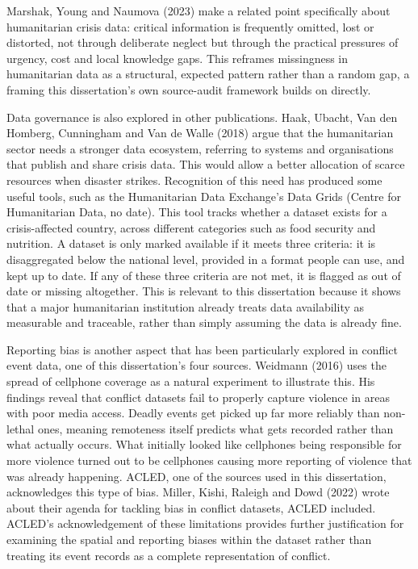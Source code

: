 \documentclass[12pt,a4paper]{article}
\begin{document}
Marshak, Young and Naumova (2023) make a related point specifically about humanitarian crisis data: critical information is frequently omitted, lost or distorted, not through deliberate neglect but through the practical pressures of urgency, cost and local knowledge gaps. This reframes missingness in humanitarian data as a structural, expected pattern rather than a random gap, a framing this dissertation's own source-audit framework builds on directly.

Data governance is also explored in other publications. Haak, Ubacht, Van den Homberg, Cunningham and Van de Walle (2018) argue that the humanitarian sector needs a stronger data ecosystem, referring to systems and organisations that publish and share crisis data. This would allow a better allocation of scarce resources when disaster strikes. Recognition of this need has produced some useful tools, such as the Humanitarian Data Exchange's Data Grids (Centre for Humanitarian Data, no date). This tool tracks whether a dataset exists for a crisis-affected country, across different categories such as food security and nutrition. A dataset is only marked available if it meets three criteria: it is disaggregated below the national level, provided in a format people can use, and kept up to date. If any of these three criteria are not met, it is flagged as out of date or missing altogether. This is relevant to this dissertation because it shows that a major humanitarian institution already treats data availability as measurable and traceable, rather than simply assuming the data is already fine.

Reporting bias is another aspect that has been particularly explored in conflict event data, one of this dissertation's four sources. Weidmann (2016) uses the spread of cellphone coverage as a natural experiment to illustrate this. His findings reveal that conflict datasets fail to properly capture violence in areas with poor media access. Deadly events get picked up far more reliably than non-lethal ones, meaning remoteness itself predicts what gets recorded rather than what actually occurs. What initially looked like cellphones being responsible for more violence turned out to be cellphones causing more reporting of violence that was already happening. ACLED, one of the sources used in this dissertation, acknowledges this type of bias. Miller, Kishi, Raleigh and Dowd (2022) wrote about their agenda for tackling bias in conflict datasets, ACLED included. ACLED's acknowledgement of these limitations provides further justification for examining the spatial and reporting biases within the dataset rather than treating its event records as a complete representation of conflict.
\end{document}
